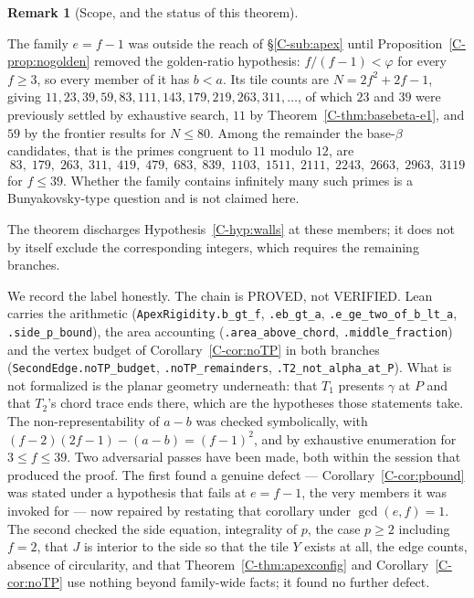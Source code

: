 \documentclass[11pt,reqno]{amsart}
\theoremstyle{plain}
\theoremstyle{definition}
\newtheorem{remark}[theorem]{Remark}
\begin{document}
\begin{remark}[Scope, and the status of this theorem]\label{O-efminus1}

The family $e=f-1$ was outside the reach of \S\ref{C-sub:apex} until Proposition~\ref{C-prop:nogolden}
removed the golden-ratio hypothesis: $f/(f-1)<\varphi$ for every $f\ge3$, so every member of it has
$b<a$. Its tile counts are $N=2f^{2}+2f-1$, giving $11, 23, 39, 59, 83, 111, 143, 179, 219, 263,
311,\dots$, of which $23$ and $39$ were previously settled by exhaustive search, $11$ by
Theorem~\ref{C-thm:basebeta-e1}, and $59$ by the frontier results for $N\le80$. Among the remainder the
base-$\beta$ candidates, that is the primes congruent to $11$ modulo $12$, are
\[
83,\;179,\;263,\;311,\;419,\;479,\;683,\;839,\;1103,\;1511,\;2111,\;2243,\;2663,\;2963,\;3119
\]
for $f\le39$. Whether the family contains infinitely many such primes is a Bunyakovsky-type question
and is not claimed here.

The theorem discharges Hypothesis~\ref{C-hyp:walls} at these members; it does not by itself exclude the
corresponding integers, which requires the remaining branches.

We record the label honestly. The chain is PROVED, not VERIFIED. Lean carries the arithmetic
(\texttt{ApexRigidity.b\_gt\_f}, \texttt{.eb\_gt\_a}, \texttt{.e\_ge\_two\_of\_b\_lt\_a},
\texttt{.side\_p\_bound}), the area accounting (\texttt{.area\_above\_chord}, \texttt{.middle\_fraction})
and the vertex budget of Corollary~\ref{C-cor:noTP} in both branches
(\texttt{SecondEdge.noTP\_budget}, \texttt{.noTP\_remainders}, \texttt{.T2\_not\_alpha\_at\_P}). What is
not formalized is the planar geometry underneath: that $T_1$ presents $\gamma$ at $P$ and that $T_2$'s
chord trace ends there, which are the hypotheses those statements take. The non-representability of $a-b$
was checked symbolically, with $(f-2)(2f-1)-(a-b)=(f-1)^{2}$, and by exhaustive enumeration for
$3\le f\le39$. Two adversarial passes have been made, both within the session that produced the proof. The first
found a genuine defect --- Corollary~\ref{C-cor:pbound} was stated under a hypothesis that fails at
$e=f-1$, the very members it was invoked for --- now repaired by restating that corollary under
$\gcd(e,f)=1$. The second checked the side equation, integrality of $p$, the case $p\ge2$ including
$f=2$, that $J$ is interior to the side so that the tile $Y$ exists at all, the edge counts, absence of
circularity, and that Theorem~\ref{C-thm:apexconfig} and Corollary~\ref{C-cor:noTP} use nothing beyond
family-wide facts; it found no further defect.


\end{remark}
\end{document}
